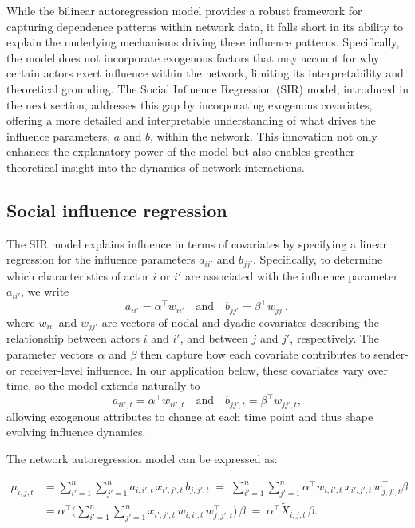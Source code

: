 While the bilinear autoregression model provides a robust framework for capturing dependence patterns within network data, it falls short in its ability to explain the underlying mechanisms driving these influence patterns. Specifically, the model does not incorporate exogenous factors that may account for why certain actors exert influence within the network, limiting its interpretability and theoretical grounding. The Social Influence Regression (SIR) model, introduced in the next section, addresses this gap by incorporating exogenous covariates, offering a more detailed and interpretable understanding of what drives the influence parameters, $a$ and $b$, within the network. This innovation not only enhances the explanatory power of the model but also enables greather theoretical insight into the dynamics of network interactions.

\subsection*{Social influence regression}

The SIR model explains influence in terms of covariates by specifying a linear regression for the influence parameters $a_{ii'}$ and $b_{jj'}$. Specifically, to determine which characteristics of actor $i$ or $i'$ are associated with the influence parameter $a_{ii'}$, we write
\[
a_{ii'} = \alpha^{\top} w_{ii'} 
\quad \text{and} \quad
b_{jj'} = \beta^{\top} w_{jj'},
\]
where $w_{ii'}$ and $w_{jj'}$ are vectors of nodal and dyadic covariates describing the relationship between actors $i$ and $i'$, and between $j$ and $j'$, respectively. The parameter vectors $\alpha$ and $\beta$ then capture how each covariate contributes to sender- or receiver-level influence. In our application below, these covariates vary over time, so the model extends naturally to
\[
a_{ii',t} = \alpha^{\top} w_{ii',t}
\quad \text{and} \quad
b_{jj',t} = \beta^{\top} w_{jj',t},
\]
allowing exogenous attributes to change at each time point and thus shape evolving influence dynamics.

The network autoregression model can be expressed as:

\begin{align*}
	\mu_{i,j,t}  
	&= \sum_{i'=1}^{n} \sum_{j'=1}^{n} a_{i,i',t} \, x_{i',j',t} \, b_{j,j',t} 
	  \;=\; \sum_{i'=1}^{n} \sum_{j'=1}^{n} \alpha^{\top} w_{i,i',t} 
		  \, x_{i',j',t} \, w_{j,j',t}^{\top} \beta 
	\\
	&= \alpha^{\top} \biggl(\sum_{i'=1}^{n} \sum_{j'=1}^{n} 
			  x_{i',j',t}\, w_{i,i',t} \, w_{j,j',t}^{\top} 
		\biggr) 
	  \,\beta
	\;=\; \alpha^{\top} \tilde{X}_{i,j,t}\,\beta.
\end{align*}
	

